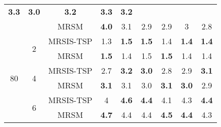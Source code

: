 \begin{table}[]
\begin{tabular}{|c|c|c|cccccc|}
  \multicolumn{1}{c|}{\textbf{3.3}} &
  \multicolumn{1}{c|}{\textbf{3.0}} &
  \multicolumn{1}{c|}{\textbf{3.2}} &
  \multicolumn{1}{c|}{\textbf{3.3}} &
  \textbf{3.2} \\ \cline{3-9}
 &
   &
  MRSM &
  \multicolumn{1}{c|}{\textbf{4.0}} &
  \multicolumn{1}{c|}{3.1} &
  \multicolumn{1}{c|}{2.9} &
  \multicolumn{1}{c|}{2.9} &
  \multicolumn{1}{c|}{3} &
  2.8 \\ \hline\hline
\multirow{6}{*}{80} &
  \multirow{2}{*}{2} &
  MRSIS-TSP\cite{li2024mrsis} &
  \multicolumn{1}{c|}{1.3} &
  \multicolumn{1}{c|}{\textbf{1.5}} &
  \multicolumn{1}{c|}{\textbf{1.5}} &
  \multicolumn{1}{c|}{1.4} &
  \multicolumn{1}{c|}{\textbf{1.4}} &
  \textbf{1.4} \\ \cline{3-9}
 &
   &
  MRSM &
  \multicolumn{1}{c|}{\textbf{1.5}} &
  \multicolumn{1}{c|}{1.4} &
  \multicolumn{1}{c|}{1.5} &
  \multicolumn{1}{c|}{\textbf{1.5}} &
  \multicolumn{1}{c|}{1.4} &
  1.4 \\ \cline{2-9}
 &
  \multirow{2}{*}{4} &
  MRSIS-TSP\cite{li2024mrsis} &
  \multicolumn{1}{c|}{2.7} &
  \multicolumn{1}{c|}{\textbf{3.2}} &
  \multicolumn{1}{c|}{\textbf{3.0}} &
  \multicolumn{1}{c|}{2.8} &
  \multicolumn{1}{c|}{2.9} &
  \textbf{3.1} \\ \cline{3-9}
 &
   &
  MRSM &
  \multicolumn{1}{c|}{\textbf{3.1}} &
  \multicolumn{1}{c|}{3.1} &
  \multicolumn{1}{c|}{3.0} &
  \multicolumn{1}{c|}{\textbf{3.1}} &
  \multicolumn{1}{c|}{\textbf{3.0}} &
  2.9 \\ \cline{2-9}
 &
  \multirow{2}{*}{6} &
  MRSIS-TSP\cite{li2024mrsis} &
  \multicolumn{1}{c|}{4} &
  \multicolumn{1}{c|}{\textbf{4.6}} &
  \multicolumn{1}{c|}{\textbf{4.4}} &
  \multicolumn{1}{c|}{4.1} &
  \multicolumn{1}{c|}{4.3} &
  \textbf{4.4} \\ \cline{3-9}
 &
   &
  MRSM &
  \multicolumn{1}{c|}{\textbf{4.7}} &
  \multicolumn{1}{c|}{4.4} &
  \multicolumn{1}{c|}{4.4} &
  \multicolumn{1}{c|}{\textbf{4.5}} &
  \multicolumn{1}{c|}{\textbf{4.4}} &
  4.3 \\ \hline
\end{tabular}
\end{table}


